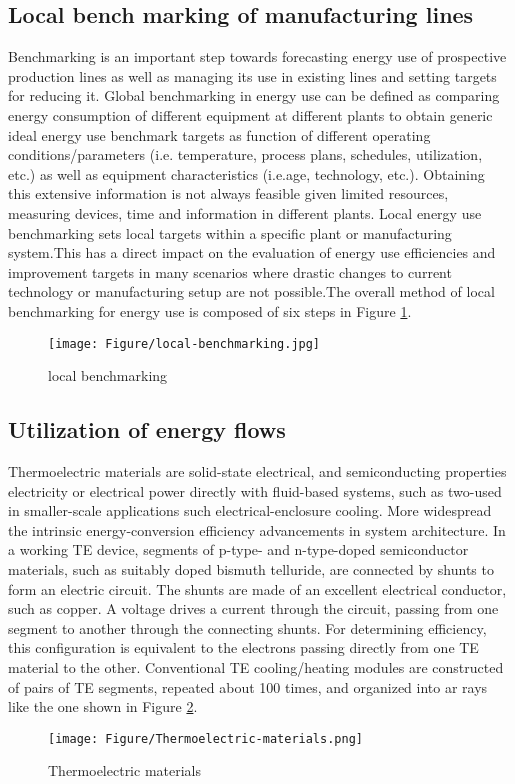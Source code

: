  
\subsection{Local bench marking of manufacturing lines}

Benchmarking is an important step towards forecasting energy use of prospective production lines as well as managing its use in existing lines and setting targets for reducing it. Global benchmarking in energy use can be defined as comparing energy consumption of different equipment at different plants to obtain generic ideal energy use benchmark targets as function of different operating conditions/parameters (i.e. temperature, process plans, schedules, utilization, etc.) as well as equipment characteristics (i.e.age, technology, etc.). Obtaining this extensive information is not always feasible given limited resources, measuring devices, time and information in different plants. Local energy use benchmarking sets local targets within a specific plant or manufacturing system.This has a direct impact on the evaluation of energy use efficiencies and improvement targets in many scenarios where drastic changes to current technology or manufacturing setup are not possible.The overall method of local benchmarking for energy use is composed of six steps in Figure \ref{fig:local-benchmarking}\cite{ElMaraghy2017}.

\begin{figure}[h!]
	\centering
	\texttt{[image: Figure/local-benchmarking.jpg]}
	\caption{local benchmarking}
	\label{fig:local-benchmarking}
\end{figure}

\subsection{Utilization of energy flows}

Thermoelectric materials are solid-state electrical, and semiconducting properties electricity or electrical power directly with fluid-based systems, such as two-used in smaller-scale applications such electrical-enclosure cooling. More widespread the intrinsic energy-conversion efficiency advancements in system architecture. In a working TE device, segments of p-type- and n-type-doped semiconductor materials, such as suitably doped bismuth telluride, are connected by shunts to form an electric circuit. The shunts are made of an excellent electrical conductor, such as copper. A voltage drives a current through the circuit, passing from one segment to another through the connecting shunts. For determining efficiency, this configuration is equivalent to the electrons passing directly from one TE material to the other. Conventional TE cooling/heating modules are constructed of pairs of TE segments, repeated about 100 times, and organized into ar rays like the one shown in Figure \ref{fig:Thermoelectric materials}\cite{Bell2008}.

\begin{figure}[H]
	\centering
	\texttt{[image: Figure/Thermoelectric-materials.png]}
	\caption{Thermoelectric materials}
	\label{fig:Thermoelectric materials}
\end{figure}